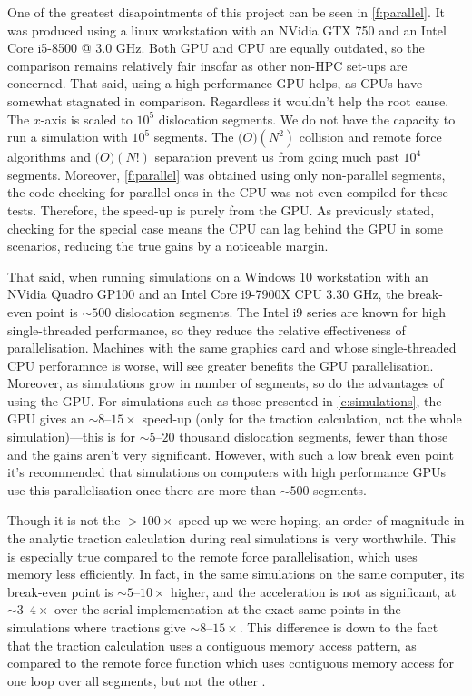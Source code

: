 One of the greatest disapointments of this project can be seen in \cref{f:parallel}. It was produced using a linux workstation with an NVidia GTX 750 and an Intel Core i5-8500 @ 3.0 GHz. Both GPU and CPU are equally outdated, so the comparison remains relatively fair insofar as other non-HPC set-ups are concerned. That said, using a high performance GPU helps, as CPUs have somewhat stagnated in comparison. Regardless it wouldn't help the root cause. The $x$-axis is scaled to $10^5$ dislocation segments. We do not have the capacity to run a simulation with $10^5$ segments. The $\mathcal(O)(N^2)$ collision and remote force algorithms and $\mathcal(O)(N!)$ separation prevent us from going much past $10^4$ segments. Moreover, \cref{f:parallel} was obtained using only non-parallel segments, the code checking for parallel ones in the CPU was not even compiled for these tests. Therefore, the speed-up is purely from the GPU. As previously stated, checking for the special case means the CPU can lag behind the GPU in some scenarios, reducing the true gains by a noticeable margin.

That said, when running simulations on a Windows 10 workstation with an NVidia Quadro GP100 and an Intel Core i9-7900X CPU \@ 3.30 GHz, the break-even point is $\sim 500$ dislocation segments. The Intel i9 series are known for high single-threaded performance, so they reduce the relative effectiveness of parallelisation. Machines with the same graphics card and whose single-threaded CPU perforamnce is worse, will see greater benefits the GPU parallelisation. Moreover, as simulations grow in number of segments, so do the advantages of using the GPU. For simulations such as those presented in \cref{c:simulations}, the GPU gives an $\sim 8$--$15\times$ speed-up (only for the traction calculation, not the whole simulation)---this is for $\sim 5$--$20$ thousand dislocation segments, fewer than those and the gains aren't very significant. However, with such a low break even point it's recommended that simulations on computers with high performance GPUs use this parallelisation once there are more than $\sim 500$ segments.

Though it is not the $>100\times$ speed-up we were hoping, an order of magnitude in the analytic traction calculation during real simulations is very worthwhile. This is especially true compared to the remote force parallelisation, which uses memory less efficiently. In fact, in the same simulations on the same computer, its break-even point is $\sim 5$--$10\times$ higher, and the acceleration is not as significant, at $\sim 3$--$4 \times$ over the serial implementation at the exact same points in the simulations where tractions give $\sim 8$--$15\times$. This difference is down to the fact that the traction calculation uses a contiguous memory access pattern, as compared to the remote force function which uses contiguous memory access for one loop over all segments, but not the other \cite{gpu_ddd}.

